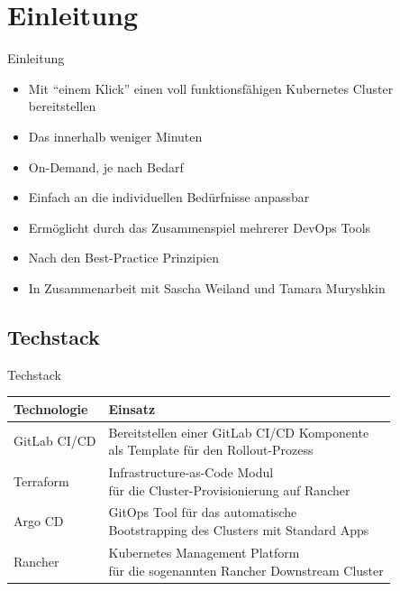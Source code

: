 \documentclass[aspectratio=169]{beamer}
\begin{document}
\section{Einleitung}
\begin{frame}{Einleitung}
    \begin{itemize}
        \item Mit "`einem Klick"' einen voll funktionsfähigen Kubernetes Cluster bereitstellen\pause
        \item Das innerhalb weniger Minuten\pause
        \item On-Demand, je nach Bedarf\pause
        \item Einfach an die individuellen Bedürfnisse anpassbar\pause
        \item Ermöglicht durch das Zusammenspiel mehrerer DevOps Tools\pause
        \item Nach den Best-Practice Prinzipien\pause
        \item In Zusammenarbeit mit Sascha Weiland und Tamara Muryshkin
    \end{itemize}
\end{frame}

\subsection{Techstack}
\begin{frame}{Techstack}
    \renewcommand{\arraystretch}{2}
    \begin{table}[htbp]
        \centering
        \begin{tabular}{l@{\hskip 1.25cm}l}
            \textbf{Technologie} & \textbf{Einsatz} \\
            \hline
            GitLab CI/CD & \makecell[l]{Bereitstellen einer GitLab CI/CD Komponente \\ als Template für den Rollout-Prozess} \\
            \hline
            Terraform & \makecell[l]{Infrastructure-as-Code Modul \\ für die Cluster-Provisionierung auf Rancher} \\
            \hline
            Argo CD & \makecell[l]{GitOps Tool für das automatische \\ Bootstrapping des Clusters mit Standard Apps} \\
            \hline
            Rancher & \makecell[l]{Kubernetes Management Platform \\ für die sogenannten Rancher Downstream Cluster} \\
        \end{tabular}
    \end{table}
\end{frame}
\end{document}
